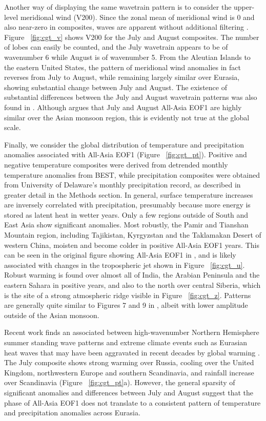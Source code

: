 	Another way of displaying the same wavetrain pattern is to consider the upper-level meridional wind (V200). Since the zonal mean of meridional wind is 0 and also near-zero in composites, waves are apparent without additional filtering \citep{Branstator2002}. Figure ~\ref{fig:cgt_v} shows V200 for the July and August composites. The number of lobes can easily be counted, and the July wavetrain appears to be of wavenumber 6 while August is of wavenumber 5. From the Aleutian Islands to the eastern United States, the pattern of meridional wind anomalies in fact reverses from July to August, while remaining largely similar over Eurasia, showing substantial change between July and August. The existence of substantial differences between the July and August wavetrain patterns was also found in \citet{Ding2005a}. Although \citet{Day2015} argues that July and August All-Asia EOF1 are highly similar over the Asian monsoon region, this is evidently not true at the global scale.
	
	Finally, we consider the global distribution of temperature and precipitation anomalies associated with All-Asia EOF1 (Figure ~\ref{fig:cgt_pt}). Positive and negative temperature composites were derived from detrended monthly temperature anomalies from BEST, while precipitation composites were obtained from University of Delaware's monthly precipitation record, as described in greater detail in the Methods section. In general, surface temperature increases are inversely correlated with precipitation, presumably because more energy is stored as latent heat in wetter years. Only a few regions outside of South and East Asia show significant anomalies. Most robustly, the Pamir and Tianshan Mountain region, including Tajikistan, Kyrgyzstan and the Taklamakan Desert of western China, moisten and become colder in positive All-Asia EOF1 years. This can be seen in the original figure showing All-Asia EOF1 in \citet{Day2015}, and is likely associated with changes in the tropospheric jet shown in Figure ~\ref{fig:cgt_u}. Robust warming is found over almost all of India, the Arabian Peninsula and the eastern Sahara in positive years, and also to the north over central Siberia, which is the site of a strong atmospheric ridge visible in Figure ~\ref{fig:cgt_z}. Patterns are generally quite similar to Figures 7 and 9 in \citet{Ding2005}, albeit with lower amplitude outside of the Asian monsoon.
	
	Recent work finds an associated between high-wavenumber Northern Hemisphere summer standing wave patterns and extreme climate events such as Eurasian heat waves that may have been aggravated in recent decades by global warming \citep{Petoukhov2013,Schubert2014a}. The July composite shows strong warming over Russia, cooling over the United Kingdom, northwestern Europe and southern Scandinavia, and rainfall increase over Scandinavia (Figure ~\ref{fig:cgt_pt}a). However, the general sparsity of significant anomalies and differences between July and August suggest that the phase of All-Asia EOF1 does not translate to a consistent pattern of temperature and precipitation anomalies across Eurasia.
	
